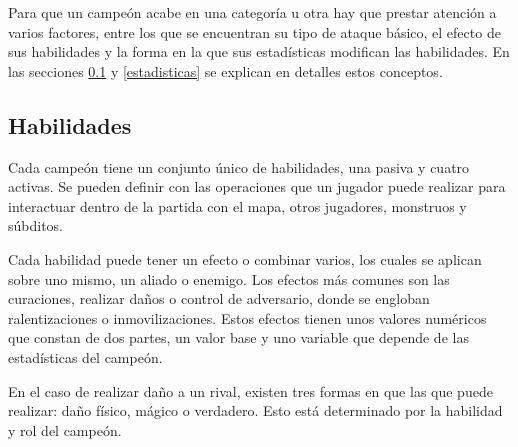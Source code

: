 Para que un campeón acabe en una categoría u otra hay que prestar atención a varios factores, entre los que se encuentran su tipo de ataque básico, el efecto de sus habilidades y la forma en la que sus estadísticas modifican las habilidades. En las secciones \ref{habilidades} y \ref{estadisticas} se explican en detalles estos conceptos.

\subsection{Habilidades}
\label{habilidades}
Cada campeón tiene un conjunto único de habilidades, una pasiva y cuatro activas. Se pueden definir con las operaciones que un jugador puede realizar para interactuar dentro de la partida con el mapa, otros jugadores, monstruos y súbditos.

Cada habilidad puede tener un efecto o combinar varios, los cuales se aplican sobre uno mismo, un aliado o enemigo. Los efectos más comunes son las curaciones, realizar daños o control de adversario, donde se engloban ralentizaciones o inmovilizaciones. Estos efectos tienen unos valores numéricos que constan de dos partes, un valor base y uno variable que depende de las estadísticas del campeón.

En el caso de realizar daño a un rival, existen tres formas en que las que puede realizar: daño físico, mágico o verdadero. Esto está determinado por la habilidad y rol del campeón.

